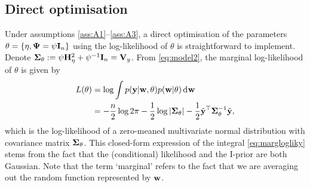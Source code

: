 \subsection{Direct optimisation}

Under assumptions \ref{ass:A1}--\ref{ass:A3}, a direct optimisation of the parameters $\theta=\{\eta,\bPsi=\psi\bI_n \}$ using the log-likelihood of $\theta$ is straightforward to implement.
Denote $\bSigma_\theta := \psi\bH_\eta^2 + \psi^{-1}\bI_n = \bV_y$.
From \cref{eq:model2}, the marginal log-likelihood of $\theta$ is given by
\begin{align}
  L(\theta)
  &= \log \int p(\by|\bw,\theta)p(\bw|\theta) \dint \bw \nonumber \\
  &= -\half[n]\log 2\pi - \half\log\vert \bSigma_\theta \vert - \half \tilde\by^\top \bSigma_\theta^{-1} \tilde\by \label{eq:marglogliky},
\end{align}
which is the log-likelihood of a zero-meaned multivariate normal distribution with covariance matrix $\bSigma_\theta$.
This closed-form expression of the integral \cref{eq:marglogliky} stems from the fact that the (conditional) likelihood and the I-prior are both Gaussian.
Note that the term `marginal' refers to the fact that we are averaging out the random function represented by $\bw$.

